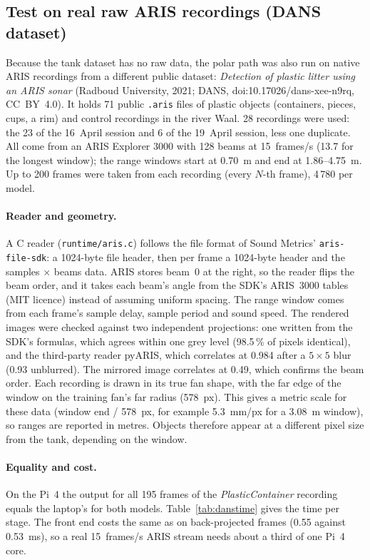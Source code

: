 \documentclass[11pt,a4paper]{article}
\begin{document}
\subsection{Test on real raw ARIS recordings (DANS dataset)}
\label{sec:dans}
Because the tank dataset has no raw data, the polar path was also run on
native ARIS recordings from a different public dataset: \emph{Detection of
plastic litter using an ARIS sonar} (Radboud University, 2021; DANS,
doi:10.17026/dans-xee-n9rq, CC~BY~4.0). It holds 71 public \texttt{.aris}
files of plastic objects (containers, pieces, cups, a rim) and control
recordings in the river Waal. 28 recordings were used: the 23 of the
16~April session and 6 of the 19~April session, less one duplicate. All
come from an ARIS Explorer 3000 with 128 beams at 15~frames/s (13.7 for the
longest window); the range windows start at 0.70~m and end at 1.86--4.75~m.
Up to 200 frames were taken from each recording (every $N$-th frame), 4\,780
per model.

\paragraph{Reader and geometry.} A C reader (\texttt{runtime/aris.c})
follows the file format of Sound Metrics' \texttt{aris-file-sdk}: a
1024-byte file header, then per frame a 1024-byte header and the samples
$\times$ beams data. ARIS stores beam~0 at the right, so the reader flips the
beam order, and it takes each beam's angle from the SDK's ARIS~3000 tables
(MIT licence) instead of assuming uniform spacing. The range window comes
from each frame's sample delay, sample period and sound speed. The rendered
images were checked against two independent projections: one written from
the SDK's formulas, which agrees within one grey level (98.5\,\% of pixels
identical), and the third-party reader pyARIS, which correlates at 0.984
after a $5 \times 5$ blur (0.93 unblurred). The mirrored image correlates at
0.49, which confirms the beam order. Each recording is drawn in its true fan
shape, with the far edge of the window on the training fan's far radius
(578~px). This gives a metric scale for these data (window end / 578~px, for
example 5.3~mm/px for a 3.08~m window), so ranges are reported in metres.
Objects therefore appear at a different pixel size from the tank, depending
on the window.

\paragraph{Equality and cost.} On the Pi~4 the output for all 195 frames of
the \emph{PlasticContainer} recording equals the laptop's for both models.
Table~\ref{tab:danstime} gives the time per stage. The front end costs the
same as on back-projected frames (0.55 against 0.53~ms), so a real 15~frames/s
ARIS stream needs about a third of one Pi~4 core.
\end{document}
